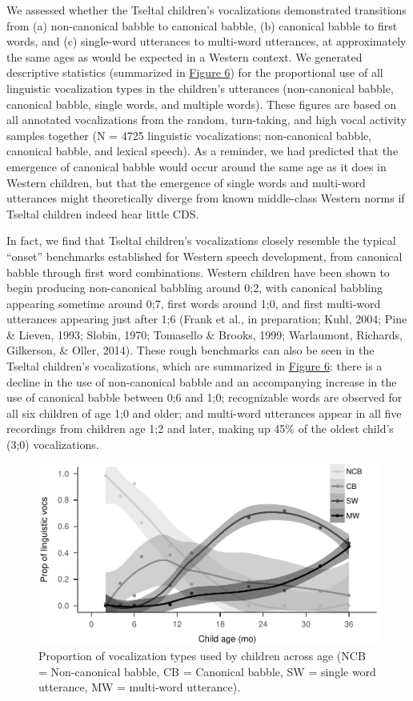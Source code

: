 \documentclass[floatsintext,man]{apa6}
\theoremstyle{definition}
\theoremstyle{definition}
\theoremstyle{definition}
\theoremstyle{remark}
\begin{document}
We assessed whether the Tseltal children's vocalizations demonstrated
transitions from (a) non-canonical babble to canonical babble, (b)
canonical babble to first words, and (c) single-word utterances to
multi-word utterances, at approximately the same ages as would be
expected in a Western context. We generated descriptive statistics
(summarized in \protect\hyperlink{fig6}{Figure 6}) for the proportional
use of all linguistic vocalization types in the children's utterances
(non-canonical babble, canonical babble, single words, and multiple
words). These figures are based on all annotated vocalizations from the
random, turn-taking, and high vocal activity samples together (N = 4725
linguistic vocalizations; non-canonical babble, canonical babble, and
lexical speech). As a reminder, we had predicted that the emergence of
canonical babble would occur around the same age as it does in Western
children, but that the emergence of single words and multi-word
utterances might theoretically diverge from known middle-class Western
norms if Tseltal children indeed hear little CDS.

In fact, we find that Tseltal children's vocalizations closely resemble
the typical \enquote{onset} benchmarks established for Western speech
development, from canonical babble through first word combinations.
Western children have been shown to begin producing non-canonical
babbling around 0;2, with canonical babbling appearing sometime around
0;7, first words around 1;0, and first multi-word utterances appearing
just after 1;6 (Frank et al., in preparation; Kuhl, 2004; Pine \&
Lieven, 1993; Slobin, 1970; Tomasello \& Brooks, 1999; Warlaumont,
Richards, Gilkerson, \& Oller, 2014). These rough benchmarks can also be
seen in the Tseltal children's vocalizations, which are summarized in
\protect\hyperlink{fig6}{Figure 6}: there is a decline in the use of
non-canonical babble and an accompanying increase in the use of
canonical babble between 0;6 and 1;0; recognizable words are observed
for all six children of age 1;0 and older; and multi-word utterances
appear in all five recordings from children age 1;2 and later, making up
45\% of the oldest child's (3;0) vocalizations.

\begin{figure}
\centering
\includegraphics{Tseltal-CLE_files/figure-latex/fig6-1.pdf}
\caption{\label{fig:fig6}Proportion of vocalization types used by children
across age (NCB = Non-canonical babble, CB = Canonical babble, SW =
single word utterance, MW = multi-word utterance).}
\end{figure}
\end{document}
